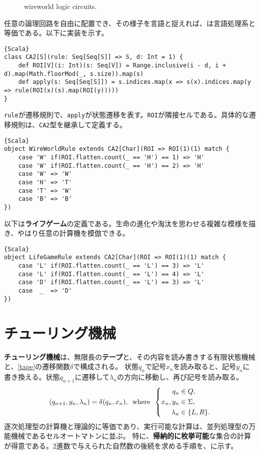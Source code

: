\documentclass[10pt,a4paper]{book}
\begin{document}
\begin{figure}[h]
\centering
{} \quad
{}
\caption{wireworld logic circuits.\label{fig:wire}}
\end{figure}

任意の論理回路を自由に配置でき、その様子を言語と捉えれば、は言語処理系と等価である。以下に実装を示す。

\begin{Verbatim}{Scala}
class CA2[S](rule: Seq[Seq[S]] => S, d: Int = 1) {
	def ROI[V](i: Int)(s: Seq[V]) = Range.inclusive(i - d, i + d).map(Math.floorMod(_, s.size)).map(s)
	def apply(s: Seq[Seq[S]]) = s.indices.map(x => s(x).indices.map(y => rule(ROI(x)(s).map(ROI(y)))))
}
\end{Verbatim}

\texttt{rule}が遷移規則で、\texttt{apply}が状態遷移を表す。\texttt{ROI}が隣接セルである。具体的な遷移規則は、\texttt{CA2}型を継承して定義する。

\begin{Verbatim}{Scala}
object WireWorldRule extends CA2[Char](ROI => ROI(1)(1) match {
	case 'W' if(ROI.flatten.count(_ == 'H') == 1) => 'H'
	case 'W' if(ROI.flatten.count(_ == 'H') == 2) => 'H'
	case 'W' => 'W'
	case 'H' => 'T'
	case 'T' => 'W'
	case 'B' => 'B'
})
\end{Verbatim}

以下は\textbf{ライフゲーム}の定義である。生命の進化や淘汰を思わせる複雑な模様を描き、やはり任意の計算機を模倣できる。

\begin{Verbatim}{Scala}
object LifeGameRule extends CA2[Char](ROI => ROI(1)(1) match {
	case 'L' if(ROI.flatten.count(_ == 'L') == 3) => 'L'
	case 'L' if(ROI.flatten.count(_ == 'L') == 4) => 'L'
	case 'D' if(ROI.flatten.count(_ == 'L') == 3) => 'L'
	case  _  => 'D'
})
\end{Verbatim}

\section{チューリング機械}

\textbf{チューリング機械}は、無限長の\textbf{テープ}と、その内容を読み書きする有限状態機械と、\eqref{tape}の遷移関数$\delta$で構成される。
状態$q_n$で記号$x_n$を読み取ると、記号$y_n$に書き換える。状態$q_{n+1}$に遷移して$\lambda_n$の方向に移動し、再び記号を読み取る。
%
\begin{equation}
\label{eq:tape}
(q_{n+1},y_n,\lambda_n) = \delta(q_n,x_n),
\enspace\mathrm{where}\enspace
\left\{
\begin{aligned}
q_n &\in Q,\\
x_n,y_n &\in \Sigma,\\
\lambda_n &\in \{L,R\}.
\end{aligned}
\right.
\end{equation}
%
逐次処理型の計算機と理論的に等価であり、実行可能な計算は、並列処理型の万能機械であるセルオートマトンに並ぶ。
特に、\textbf{帰納的に枚挙可能}な集合の計算が得意である。2進数で与えられた自然数の後続を求める手順を、に示す。
\end{document}
